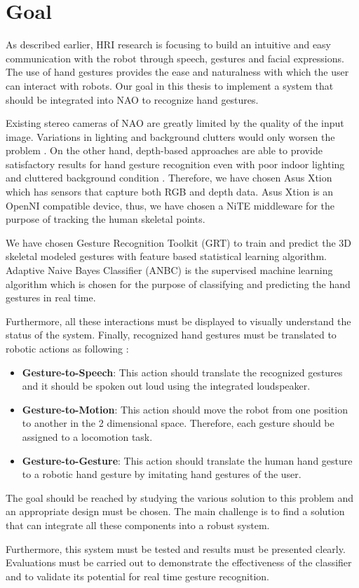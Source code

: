\chapter{Goal} As described earlier, HRI research is focusing to build an intuitive and easy communication with the robot through speech, gestures and facial expressions. The use of hand gestures provides the ease and naturalness with which the user can interact with robots. Our goal in this thesis to implement a system that should be integrated into NAO to recognize hand gestures. 

Existing stereo cameras of NAO are greatly limited by the quality of the input image. Variations in lighting and background clutters would only worsen the problem \cite{17}. On the other hand, depth-based approaches are able to provide satisfactory results for hand gesture recognition even with poor indoor lighting and cluttered background condition \cite{18}. Therefore, we have chosen Asus Xtion which has sensors that capture both RGB and depth data. Asus Xtion is an OpenNI compatible device, thus, we have chosen a NiTE middleware for the purpose of tracking the human skeletal points. 

We have chosen Gesture Recognition Toolkit (GRT) to train and predict the 3D skeletal modeled gestures with feature based statistical learning algorithm. Adaptive Naive Bayes Classifier (ANBC) is the supervised machine learning algorithm which is chosen for the purpose of classifying and predicting the hand gestures in real time.

Furthermore, all these interactions must be displayed to visually understand the status of the system. Finally, recognized hand gestures must be translated to robotic actions as following :
\begin{itemize}
	\item \textbf{Gesture-to-Speech}: This action should translate the recognized gestures and it should be spoken out loud using the integrated loudspeaker.
	
	\item \textbf{Gesture-to-Motion}: This action should move the robot from one position to another in the 2 dimensional space. Therefore, each gesture should be assigned to a locomotion task.
	
	\item \textbf{Gesture-to-Gesture}: This action should translate the human hand gesture to a robotic hand gesture by imitating hand gestures of the user. 
\end{itemize}

The goal should be reached by studying the various solution to this problem and an appropriate design must be chosen. The main challenge is to find a solution that can integrate all these components into a robust system.

Furthermore, this system must be tested and results must be presented clearly. Evaluations must be carried out to demonstrate the effectiveness of the classifier and to validate its potential for real time gesture recognition.
